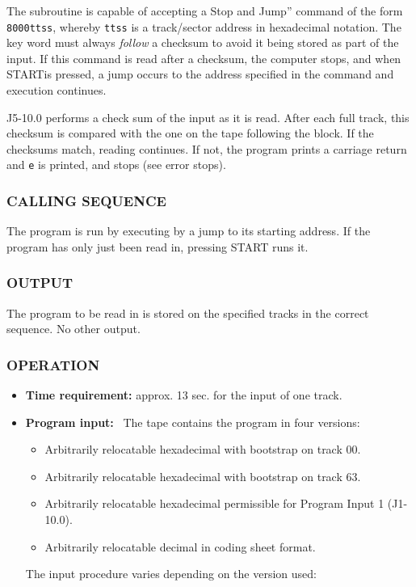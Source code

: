 The subroutine is capable of accepting a Stop and Jump'' command of the form \texttt{8000ttss}, whereby \texttt{ttss} is a track/sector address in hexadecimal notation. The key word must always \emph{follow} a checksum to avoid it being stored as part of the input. If this command is read after a checksum, the computer stops, and when \textsf{START}is pressed, a jump occurs to the address specified in the command and execution continues.

J5-10.0 performs a check sum of the input as it is read. After each full track, this checksum is compared with the one on the tape following the block. If the checksums match, reading continues. If not, the program prints a carriage return and \texttt{e} is printed, and stops (see error stops).

\subsubsection*{CALLING SEQUENCE}
The program is run by executing by a jump to its starting address. If the program has only just been read in, pressing \textsf{START} runs it.

\subsubsection*{OUTPUT}
The program to be read in is stored on the specified tracks in the correct sequence. No other output.

\subsubsection*{OPERATION}
\begin{itemize}
\item \textbf{Time requirement:} approx. 13 sec. for the input of one track.
\item \textbf{Program input:} \
The tape contains the program in four versions:
\begin{itemize}
\item[a)] Arbitrarily relocatable hexadecimal with bootstrap on track 00.
\item[b)] Arbitrarily relocatable hexadecimal with bootstrap on track 63.
\item[c)] Arbitrarily relocatable hexadecimal permissible for Program Input 1 (J1-10.0).
\item[d)] Arbitrarily relocatable decimal in coding sheet format.
\end{itemize}
The input procedure varies depending on the version used:
\end{itemize}

